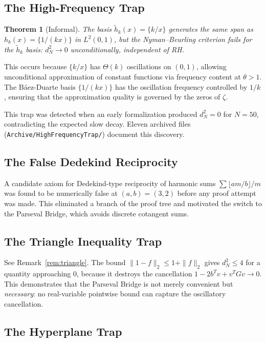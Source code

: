 \documentclass[11pt,a4paper]{article}
\theoremstyle{plain}
\newtheorem{theorem}{Theorem}[section]
\theoremstyle{definition}
\theoremstyle{remark}
\newcommand{\fract}[1]{\{#1\}}
\newcommand{\lean}[1]{\texttt{#1}}
\begin{document}
\subsection{The High-Frequency Trap}

\begin{theorem}[Informal]
The basis $\tilde{h}_k(x) = \fract{k/x}$ generates the same span as
$h_k(x) = \fract{1/(kx)}$ in $L^2(0,1)$, but the Nyman--Beurling
criterion fails for the $\tilde{h}_k$ basis: $d_N^2 \to 0$
unconditionally, independent of RH.
\end{theorem}

This occurs because $\fract{k/x}$ has $\Theta(k)$ oscillations on
$(0,1)$, allowing unconditional approximation of constant functions via
frequency content at $\theta > 1$. The B\'aez-Duarte basis
$\fract{1/(kx)}$ has the oscillation frequency controlled by $1/k$,
ensuring that the approximation quality is governed by the zeros of $\zeta$.

This trap was detected when an early formalization produced
$d_N^2 = 0$ for $N = 50$, contradicting the expected slow decay.
Eleven archived files (\lean{Archive/HighFrequencyTrap/}) document
this discovery.

\subsection{The False Dedekind Reciprocity}

A candidate axiom for Dedekind-type reciprocity of harmonic sums
$\sum \lfloor am/b \rfloor / m$ was found to be numerically false
at $(a,b) = (3,2)$ before any proof attempt was made. This eliminated
a branch of the proof tree and motivated the switch to the Parseval
Bridge, which avoids discrete cotangent sums.

\subsection{The Triangle Inequality Trap}

See Remark~\ref{rem:triangle}. The bound $\|1 - f\|_2 \leq 1 + \|f\|_2$
gives $d_N^2 \leq 4$ for a quantity approaching $0$, because it
destroys the cancellation $1 - 2b^Tv + v^TGv \to 0$. This demonstrates
that the Parseval Bridge is not merely convenient but \emph{necessary}:
no real-variable pointwise bound can capture the oscillatory cancellation.

\subsection{The Hyperplane Trap}
\end{document}
